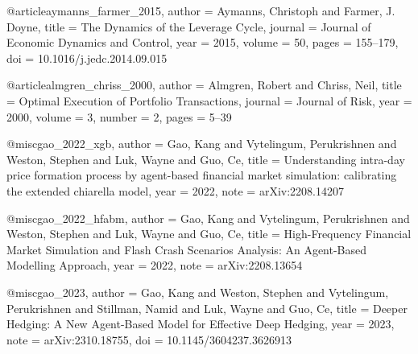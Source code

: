 @article{aymanns_farmer_2015,
  author  = {Aymanns, Christoph and Farmer, J. Doyne},
  title   = {The Dynamics of the Leverage Cycle},
  journal = {Journal of Economic Dynamics and Control},
  year    = {2015}, volume = {50}, pages = {155--179},
  doi     = {10.1016/j.jedc.2014.09.015}
}


@article{almgren_chriss_2000,
  author  = {Almgren, Robert and Chriss, Neil},
  title   = {Optimal Execution of Portfolio Transactions},
  journal = {Journal of Risk},
  year    = {2000}, volume = {3}, number = {2}, pages = {5--39}
}




@misc{gao_2022_xgb,
  author = {Gao, Kang and Vytelingum, Perukrishnen and Weston, Stephen and Luk, Wayne and Guo, Ce},
  title  = {Understanding intra-day price formation process by agent-based financial market simulation: calibrating the extended chiarella model},
  year   = {2022}, note = {arXiv:2208.14207}
}


@misc{gao_2022_hfabm,
  author = {Gao, Kang and Vytelingum, Perukrishnen and Weston, Stephen and Luk, Wayne and Guo, Ce},
  title  = {High-Frequency Financial Market Simulation and Flash Crash Scenarios Analysis: An Agent-Based Modelling Approach},
  year   = {2022}, note = {arXiv:2208.13654}
}


@misc{gao_2023,
  author = {Gao, Kang and Weston, Stephen and Vytelingum, Perukrishnen and Stillman, Namid and Luk, Wayne and Guo, Ce},
  title  = {Deeper Hedging: A New Agent-Based Model for Effective Deep Hedging},
  year   = {2023}, note = {arXiv:2310.18755},
  doi     = {10.1145/3604237.3626913}
}

